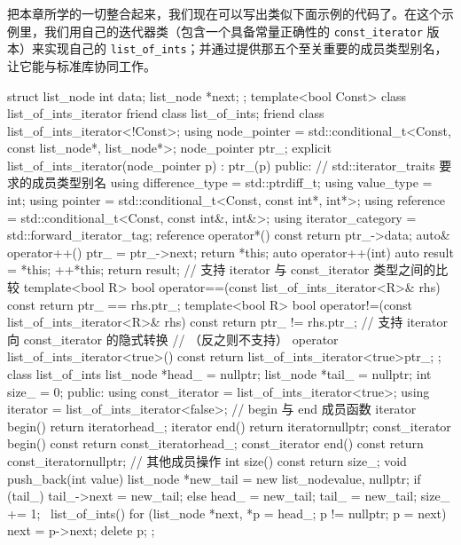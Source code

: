 把本章所学的一切整合起来，我们现在可以写出类似下面示例的代码了。在这个示例里，我们用自己的迭代器类（包含一个具备常量正确性的 \texttt{const\_\allowbreak{}iterator} 版本）来实现自己的 \texttt{list\_\allowbreak{}of\_\allowbreak{}ints}；并通过提供那五个至关重要的成员类型别名，让它能与标准库协同工作。

\begin{codebox}[cpp]
    struct list_node {
      int data;
      list_node *next;
    };
    template<bool Const>
    class list_of_ints_iterator {
      friend class list_of_ints;
      friend class list_of_ints_iterator<!Const>;
      using node_pointer = std::conditional_t<Const, const list_node*,
        list_node*>;
      node_pointer ptr_;
      explicit list_of_ints_iterator(node_pointer p) : ptr_(p) {}
    public:
      // std::iterator_traits 要求的成员类型别名
      using difference_type = std::ptrdiff_t;
      using value_type = int;
      using pointer = std::conditional_t<Const, const int*, int*>;
      using reference = std::conditional_t<Const, const int&, int&>;
      using iterator_category = std::forward_iterator_tag;
      reference operator*() const { return ptr_->data; }
      auto& operator++() { ptr_ = ptr_->next; return *this; }
      auto operator++(int) { auto result = *this; ++*this; return result; }
      // 支持 iterator 与 const_iterator 类型之间的比较
      template<bool R>
      bool operator==(const list_of_ints_iterator<R>& rhs) const
        { return ptr_ == rhs.ptr_; }
      template<bool R>
      bool operator!=(const list_of_ints_iterator<R>& rhs) const
        { return ptr_ != rhs.ptr_; }
      // 支持 iterator 向 const_iterator 的隐式转换
      // （反之则不支持）
      operator list_of_ints_iterator<true>() const { return
        list_of_ints_iterator<true>{ptr_}; }
    };
    class list_of_ints {
      list_node *head_ = nullptr;
      list_node *tail_ = nullptr;
      int size_ = 0;
    public:
      using const_iterator = list_of_ints_iterator<true>;
      using iterator = list_of_ints_iterator<false>;
      // begin 与 end 成员函数
      iterator begin() { return iterator{head_}; }
      iterator end() { return iterator{nullptr}; }
      const_iterator begin() const { return const_iterator{head_}; }
      const_iterator end() const { return const_iterator{nullptr}; }
      // 其他成员操作
      int size() const { return size_; }
      void push_back(int value) {
        list_node *new_tail = new list_node{value, nullptr};
        if (tail_) {
          tail_->next = new_tail;
        } else {
          head_ = new_tail;
        }
        tail_ = new_tail;
        size_ += 1;
      }
      ~list_of_ints() {
        for (list_node *next, *p = head_; p != nullptr; p = next) {
          next = p->next;
          delete p;
        }
      }
    };
\end{codebox}

